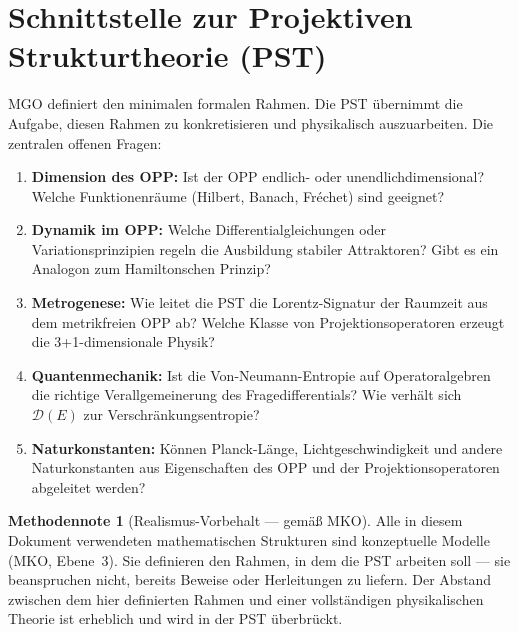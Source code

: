 \documentclass[11pt,a4paper]{article}
\theoremstyle{plain}
\theoremstyle{definition}
\newtheorem{methodennote}{Methodennote}[section]
\begin{document}
\section{Schnittstelle zur Projektiven Strukturtheorie (PST)}

MGO definiert den minimalen formalen Rahmen. Die PST \"{u}bernimmt die Aufgabe, diesen
Rahmen zu konkretisieren und physikalisch auszuarbeiten. Die zentralen offenen Fragen:

\begin{enumerate}
  \item \textbf{Dimension des OPP:} Ist der OPP endlich- oder unendlichdimensional?
        Welche Funktionenr\"{a}ume (Hilbert, Banach, Fr\'{e}chet) sind geeignet?

  \item \textbf{Dynamik im OPP:} Welche Differentialgleichungen oder Variations\-prinzipien
        regeln die Ausbildung stabiler Attraktoren? Gibt es ein Analogon zum
        Hamiltonschen Prinzip?

  \item \textbf{Metrogenese:} Wie leitet die PST die Lorentz-Signatur der Raumzeit
        aus dem metrikfreien OPP ab? Welche Klasse von Projektionsoperatoren erzeugt
        die 3+1-dimensionale Physik?

  \item \textbf{Quantenmechanik:} Ist die Von-Neumann-Entropie auf Operatoralgebren
        die richtige Verallgemeinerung des Fragedifferentials? Wie verh\"{a}lt sich
        $\mathcal{D}(E)$ zur Verschr\"{a}nkungsentropie?

  \item \textbf{Naturkonstanten:} K\"{o}nnen Planck-L\"{a}nge, Lichtgeschwindigkeit
        und andere Naturkonstanten aus Eigenschaften des OPP und der
        Projektionsoperatoren abgeleitet werden?
\end{enumerate}

\begin{methodennote}[Realismus-Vorbehalt --- gem\"{a}\ss{} MKO]
Alle in diesem Dokument verwendeten mathematischen Strukturen sind konzeptuelle Modelle
(MKO, Ebene~3). Sie definieren den Rahmen, in dem die PST arbeiten soll --- sie
beanspruchen nicht, bereits Beweise oder Herleitungen zu liefern. Der Abstand zwischen
dem hier definierten Rahmen und einer vollst\"{a}ndigen physikalischen Theorie ist
erheblich und wird in der PST \"{u}berbr\"{u}ckt.
\end{methodennote}
\end{document}
